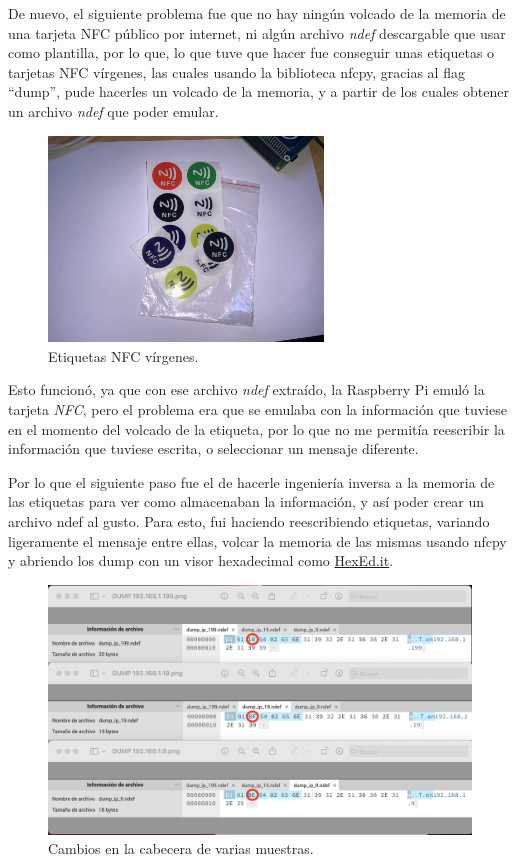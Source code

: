De nuevo, el siguiente problema fue que no hay ningún volcado de la memoria de
una tarjeta NFC público por internet, ni algún archivo \emph{ndef} descargable
que usar como plantilla, por lo que, lo que tuve que hacer fue conseguir unas
etiquetas o tarjetas NFC vírgenes, las cuales usando la biblioteca nfcpy,
gracias al flag ``dump'', pude hacerles un volcado de la memoria, y a partir de
los cuales obtener un archivo \emph{ndef} que poder emular.\\

\begin{figure}[H]
    \centering
    \includegraphics[width=0.65\textwidth]{fotos/etiqueta_nfc.jpeg}
    \caption{Etiquetas NFC vírgenes.}
\end{figure}

Esto funcionó, ya que con ese archivo \emph{ndef} extraído, la Raspberry Pi
emuló la tarjeta \emph{NFC}, pero el problema era que se emulaba con la
información que tuviese en el momento del volcado de la etiqueta, por lo que no
me permitía reescribir la información que tuviese escrita, o seleccionar un
mensaje diferente.

Por lo que el siguiente paso fue el de hacerle ingeniería inversa a la memoria de
las etiquetas para ver como almacenaban la información, y así poder crear un
archivo ndef al gusto. Para esto, fui haciendo reescribiendo etiquetas, variando
ligeramente el mensaje entre ellas, volcar la memoria de las mismas usando nfcpy
y abriendo los dump con un visor hexadecimal como
\href{https://hexed.it/}{HexEd.it}.

\begin{figure}[H]
    \centering
    \includegraphics[width=\textwidth]{fotos/muestra_dumps.png}
    \caption{Cambios en la cabecera de varias muestras.}
\end{figure}

